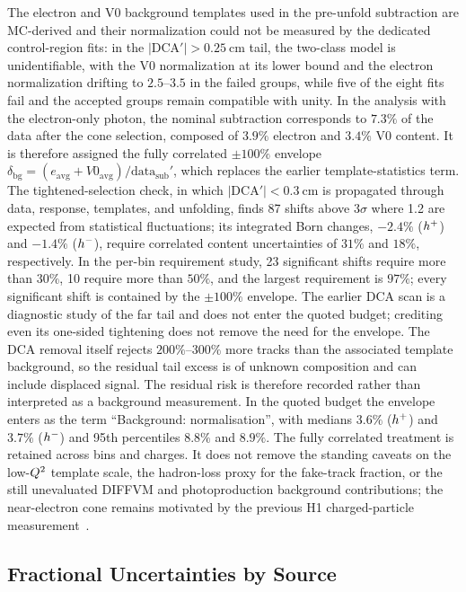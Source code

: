 The electron and V0 background templates used in the pre-unfold subtraction
are MC-derived and their normalization
could not be measured by the dedicated control-region fits: in the
$|\mathrm{DCA}'|>0.25~\mathrm{cm}$ tail, the two-class model is
unidentifiable, with the V0 normalization at its lower bound and the electron
normalization drifting to $2.5$--$3.5$ in the failed groups, while five of the
eight fits fail and the accepted groups remain compatible with unity.  In the
analysis with the electron-only photon, the nominal subtraction corresponds to $7.3\%$ of the data after the cone selection, composed
of $3.9\%$ electron and $3.4\%$ V0 content.  It is therefore assigned the
fully correlated $\pm100\%$ envelope
$\delta_{\mathrm{bg}}=(e_{\mathrm{avg}}+V0_{\mathrm{avg}})/\mathrm{data}_{\mathrm{sub}}'$,
which replaces the earlier template-statistics term.  The tightened-selection
check, in which $|\mathrm{DCA}'|<0.3~\mathrm{cm}$ is propagated through
data, response, templates, and unfolding, finds 87 shifts above $3\sigma$
where 1.2 are expected from statistical fluctuations; its integrated Born
changes, $-2.4\%$ ($h^{+}$) and $-1.4\%$ ($h^{-}$), require correlated
content uncertainties of $31\%$ and $18\%$, respectively.  In the
per-bin requirement study, 23 significant shifts require more than $30\%$,
10 require more than $50\%$, and the largest requirement is $97\%$; every
significant shift is contained by the $\pm100\%$ envelope.  The earlier DCA
scan is a diagnostic study of the far tail and does not enter the quoted
budget; crediting even its one-sided tightening does not remove the need for
the envelope.  The DCA removal itself rejects $200\%$--$300\%$ more tracks
than the associated template background, so the residual tail excess is of
unknown composition and can include displaced signal.  The residual risk is
therefore recorded rather than interpreted as a background measurement.  In the
quoted budget the envelope enters as the term ``Background: normalisation'', with
medians $3.6\%$ ($h^{+}$) and $3.7\%$ ($h^{-}$) and 95th percentiles
$8.8\%$ and $8.9\%$.
The fully correlated treatment is retained across bins and charges.  It does
not remove the standing caveats on the low-$Q^{2}$ template scale, the
hadron-loss proxy for the fake-track fraction, or the still unevaluated DIFFVM and photoproduction
background contributions; the near-electron cone remains motivated by the previous H1
charged-particle measurement~\cite{H1:2013qsm}.

\subsection{Fractional Uncertainties by Source}
\label{sec:syst:source-plots}

